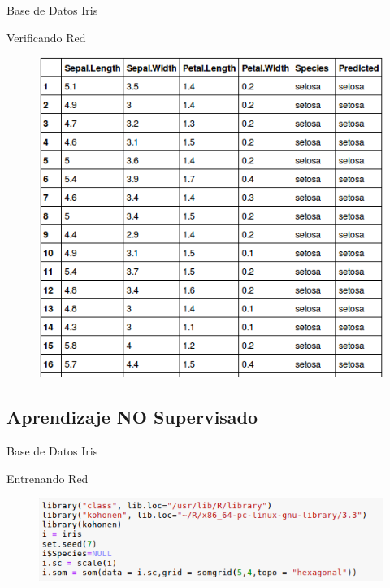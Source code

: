 \documentclass{beamer}
\begin{document}
\begin{frame}{Base de Datos Iris}
\begin{block}{Verificando Red}
\begin{figure}
\includegraphics[scale=0.4]{comparacion.png}
\centering
\end{figure}
\end{block}
\end{frame}

\subsection{Aprendizaje NO Supervisado}

\begin{frame}{Base de Datos Iris}
\begin{block}{Entrenando Red}
\begin{figure}
\includegraphics[scale=0.4]{mallairis.png}
\centering
\end{figure}
\end{block}
\end{frame}
\end{document}
